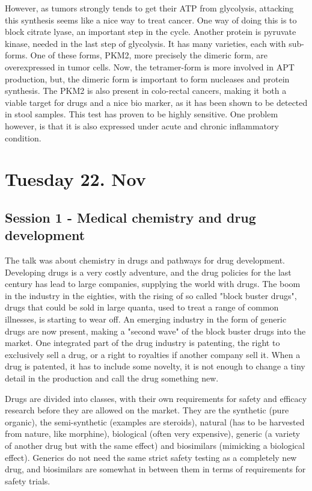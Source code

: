 \documentclass[12p]{article}
\begin{document}
However, as tumors strongly tends to get their ATP from glycolysis, attacking this synthesis seems like a nice way to treat cancer.
One way of doing this is to block citrate lyase, an important step in the cycle.
Another protein is pyruvate kinase, needed in the last step of glycolysis.
It has many varieties, each with sub-forms.
One of these forms, PKM2, more precisely the dimeric form, are overexpressed in tumor cells.
Now, the tetramer-form is more involved in APT production, but, the dimeric form is important to form nucleases and protein synthesis.
The PKM2 is also present in colo-rectal cancers, making it both a viable target for drugs and a nice bio marker, as it has been shown to be detected in stool samples.
This test has proven to be highly sensitive.
One problem however, is that it is also expressed under acute and chronic inflammatory condition.

\section*{Tuesday 22. Nov}

\subsection*{Session 1 - Medical chemistry and drug development}

The talk was about chemistry in drugs and pathways for drug development.
Developing drugs is a very costly adventure, and the drug policies for the last century has lead to large companies, supplying the world with drugs.
The boom in the industry in the eighties, with the rising of so called "block buster drugs", drugs that could be sold in large quanta, used to treat a range of common illnesses, is starting to wear off.
An emerging industry in the form of generic drugs are now present, making a "second wave" of the block buster drugs into the market.
One integrated part of the drug industry is patenting, the right to exclusively sell a drug, or a right to royalties if another company sell it.
When a drug is patented, it has to include some novelty, it is not enough to change a tiny detail in the production and call the drug something new.

Drugs are divided into classes, with their own requirements for safety and efficacy research before they are allowed on the market.
They are the synthetic (pure organic), the semi-synthetic (examples are steroids), natural (has to be harvested from nature, like morphine), biological (often very expensive), generic (a variety of another drug but with the same effect) and biosimilars (mimicking a biological effect).
Generics do not need the same strict safety testing as a completely new drug, and biosimilars are somewhat in between them in terms of requirements for safety trials.
\end{document}

